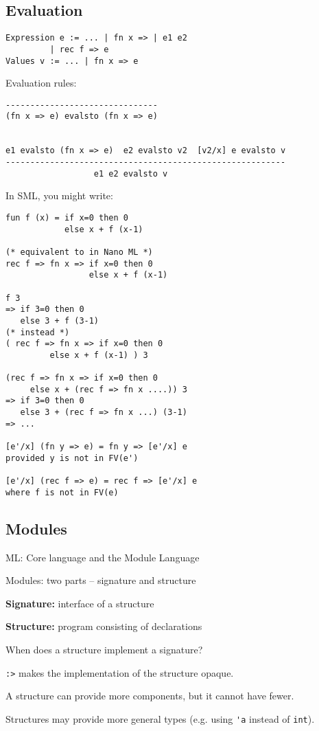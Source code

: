\documentclass[11pt]{article}
\begin{document}
\subsection{Evaluation}
\begin{verbatim}
Expression e := ... | fn x => | e1 e2
         | rec f => e
Values v := ... | fn x => e
\end{verbatim}

Evaluation rules:
\begin{verbatim}
-------------------------------
(fn x => e) evalsto (fn x => e)


e1 evalsto (fn x => e)  e2 evalsto v2  [v2/x] e evalsto v
---------------------------------------------------------
                  e1 e2 evalsto v
\end{verbatim}

In SML, you might write:
\begin{verbatim}
fun f (x) = if x=0 then 0
            else x + f (x-1)

(* equivalent to in Nano ML *)
rec f => fn x => if x=0 then 0
                 else x + f (x-1)

f 3
=> if 3=0 then 0
   else 3 + f (3-1)
(* instead *)
( rec f => fn x => if x=0 then 0
         else x + f (x-1) ) 3

(rec f => fn x => if x=0 then 0
     else x + (rec f => fn x ....)) 3
=> if 3=0 then 0
   else 3 + (rec f => fn x ...) (3-1)
=> ...

[e'/x] (fn y => e) = fn y => [e'/x] e
provided y is not in FV(e')

[e'/x] (rec f => e) = rec f => [e'/x] e
where f is not in FV(e)
\end{verbatim}

\subsection{Modules}
ML: Core language and the Module Language

Modules: two parts --  signature and structure

\textbf{Signature:} interface of a structure

\textbf{Structure:} program consisting of declarations

When does a structure implement a signature?

\verb~:>~ makes the implementation of the structure opaque. 

A structure can provide more components, but it cannot have fewer. 

Structures may provide more general types (e.g. using \verb~'a~ instead of \verb~int~).
\end{document}
